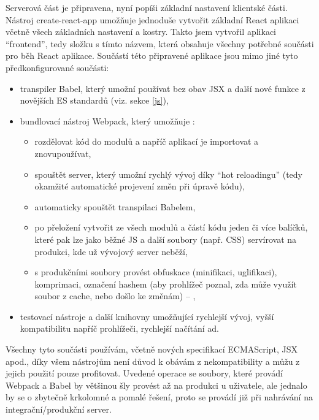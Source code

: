     Serverová část je připravena, nyní popíši základní nastavení klientské části. Nástroj create-react-app umožňuje jednoduše vytvořit základní React aplikaci včetně všech základních nastavení a kostry. Takto jsem vytvořil aplikaci \enquote{frontend}, tedy složku s tímto názvem, která obsahuje všechny potřebné součásti pro běh React aplikace. Součástí této připravené aplikace jsou mimo jiné tyto předkonfigurované součásti:
    \begin{itemize}
        \item transpiler Babel, který umožní používat bez obav JSX a další nové funkce z novějších ES standardů (viz. sekce \ref{js}),
        \item bundlovací nástroj Webpack, který umožňuje \cite{webpack-ackee}:
            \begin{itemize}
                \item rozdělovat kód do modulů a napříč aplikací je importovat a znovupoužívat,
                \item spouštět server, který umožní rychlý vývoj díky \enquote{hot reloadingu} (tedy okamžité automatické projevení změn při úpravě kódu),
                \item automaticky spouštět transpilaci Babelem,
                \item po přeložení vytvořit ze všech modulů a částí kódu jeden či více balíčků, které pak lze jako běžné JS a další soubory (např. CSS) servírovat na produkci, kde už vývojový server neběží,
                \item s produkčními soubory provést obfuskace (minifikaci, uglifikaci), komprimaci, označení hashem (aby prohlížeč poznal, zda může využít soubor z cache, nebo došlo ke změnám) -- ,
            \end{itemize}
        \item testovací nástroje a další knihovny umožňující rychlejší vývoj, vyšší kompatibilitu napříč prohlížeči, rychlejší načítání ad.
    \end{itemize}
    Všechny tyto součásti používám, včetně nových specifikací ECMAScript, JSX apod., díky všem nástrojům není důvod k obávám z nekompatibility a můžu z jejich použití pouze profitovat. Uvedené operace se soubory, které provádí Webpack a Babel by většinou šly provést až na produkci u uživatele, ale jednalo by se o zbytečně krkolomné a pomalé řešení, proto se provádí již při nahrávání na integrační/produkční server.
    
